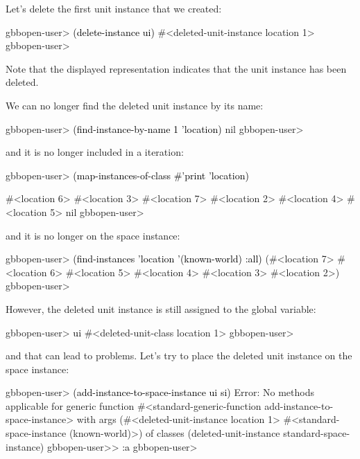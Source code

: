 \documentclass[10pt,twoside,english,pdftex]{article}
\begin{document}
%
%
%
Let's delete the first  unit instance that we created:
%
\W\supp
\begin{example}
\textcolor{darkergray}{%
  gbbopen-user> \textcolor{black}{(delete-instance ui)}
  #<deleted-unit-instance location 1>
  gbbopen-user>}
\end{example}
%
Note that the displayed representation indicates that the unit instance has
been deleted.

%
%
%
%
We can no longer find the deleted unit instance by its name:
%
\W\supp
\begin{example}
\textcolor{darkergray}{%
  gbbopen-user> \textcolor{black}{(find-instance-by-name 1 'location)}
  nil
  gbbopen-user>}
\end{example}
%
and it is no longer included in a 
iteration:
%
\W\supp\notpretop
\begin{example}
\textcolor{darkergray}{%
  gbbopen-user> \textcolor{black}{(map-instances-of-class #'print 'location)}

  #<location 6> 
  #<location 3> 
  #<location 7> 
  #<location 2> 
  #<location 4> 
  #<location 5> 
  nil
  gbbopen-user>}
\end{example}
%
and it is no longer on the  space instance:
%
\W\supp\notpretop
\begin{example}
\textcolor{darkergray}{%
  gbbopen-user> \textcolor{black}{(find-instances 'location '(known-world) :all)}
  (#<location 7> #<location 6> #<location 5> #<location 4> #<location 3>
   #<location 2>)
  gbbopen-user>}
\end{example}

%
However, the deleted  unit instance is still assigned to
the  global variable:
%
\W\supp
\begin{example}
\textcolor{darkergray}{%
  gbbopen-user> \textcolor{black}{ui}
  #<deleted-unit-class location 1>
  gbbopen-user>}
\end{example}
%
and that can lead to problems.  Let's try to place the deleted
 unit instance on the  space
instance:
%
\W\supp\notpretop
\begin{example}
\textcolor{darkergray}{%
  gbbopen-user> \textcolor{black}{(add-instance-to-space-instance ui si)}
  Error: No methods applicable for generic function
         #<standard-generic-function add-instance-to-space-instance> with args
         (#<deleted-unit-instance location 1> #<standard-space-instance (known-world)>)
         of classes (deleted-unit-instance standard-space-instance)
  gbbopen-user>> \textcolor{black}{:a}
  gbbopen-user>}
\end{example}
\end{document}
